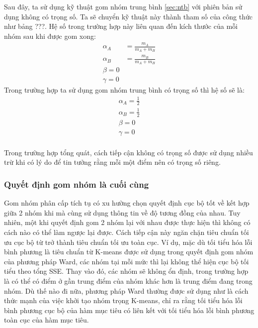 Sau đây, ta sử dụng kỹ thuật gom nhóm trung bình \ref{sec:ntb} với phiên bản sử dụng không có trọng số.
Ta sẽ chuyển kỹ thuật này thành tham số của công thức như bảng ???.
Hệ số trong trường hợp này liên quan đến kích thước của mỗi nhóm sau khi được gom xong:
\begin{equation}
\begin{aligned}
\alpha_A &= \frac{m_A}{m_A + m_B}	\\
\alpha_B &= \frac{m_B}{m_A + m_B}	\\
\beta = 0		\\
\gamma = 0
\end{aligned}
\end{equation}
Trong trường hợp ta sử dụng gom nhóm trung bình có trọng số thì hệ số sẽ là:
\begin{equation}
\begin{aligned}
\alpha_A = \frac{1}{2} \\
\alpha_B = \frac{1}{2} \\
\beta = 0		\\
\gamma = 0		\\
\end{aligned}
\end{equation}

Trong trường hợp tổng quát, cách tiếp cận không có trọng số được sử dụng nhiều trừ khi có lý do để tin tưởng rằng mỗi một điểm nên có trọng số riêng.

\subsubsection{Quyết định gom nhóm là cuối cùng}
Gom nhóm phân cấp tích tụ có xu hường chọn quyết định cục bộ tốt về kết hợp giữa 2 nhóm khi mà cùng sử dụng thông tin về độ tương đồng của nhau.
Tuy nhiên, một khi quyết định gom 2 nhóm lại với nhau được thực hiện thì không có cách nào có thể làm ngược lại được.
Cách tiếp cận này ngăn chặn tiêu chuẩn tối ưu cục bộ từ trở thành tiêu chuẩn tối ưu toàn cục.
Ví dụ, mặc dù tối tiểu hóa lỗi bình phương là tiêu chuẩn từ K-means được sử dụng trong quyết định gom nhóm của phương pháp Ward, các nhóm tại mỗi mức thì lại không thể hiện cục bộ tối tiểu theo tổng SSE.
Thay vào đó, các nhóm sẽ không ổn định, trong trường hợp là có thể có điểm ở gần trung điểm của nhóm khác hơn là trung điểm đang trong nhóm.
Dù thế nào đi nữa, phương pháp Ward thường được sử dụng như là cách thức mạnh của việc khởi tạo nhóm trọng K-means, chỉ ra rằng tối tiểu hóa lỗi bình phương cục bộ của hàm mục tiêu có liên kết với tối tiểu hóa lỗi bình phương toàn cục của hàm mục tiêu.

